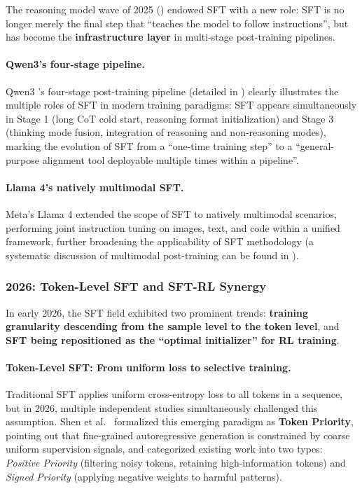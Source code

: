 The reasoning model wave of 2025 ()
endowed SFT with a new role:
SFT is no longer merely the final step that ``teaches the model to follow instructions'',
but has become the \textbf{infrastructure layer} in multi-stage post-training pipelines.

\paragraph{Qwen3's four-stage pipeline.}
Qwen3 \cite{yang2025qwen3}'s four-stage post-training pipeline (detailed in )
clearly illustrates the multiple roles of SFT in modern training paradigms:
SFT appears simultaneously in Stage 1 (long CoT cold start, reasoning format initialization)
and Stage 3 (thinking mode fusion, integration of reasoning and non-reasoning modes),
marking the evolution of SFT from a ``one-time training step'' to a ``general-purpose alignment tool deployable multiple times within a pipeline''.

\paragraph{Llama 4's natively multimodal SFT.}
Meta's Llama 4 \cite{meta2025llama4} extended the scope of SFT to natively multimodal scenarios,
performing joint instruction tuning on images, text, and code within a unified framework,
further broadening the applicability of SFT methodology
(a systematic discussion of multimodal post-training can be found in ).

\subsubsection{2026: Token-Level SFT and SFT-RL Synergy}
\label{sec:t1-2026}

In early 2026, the SFT field exhibited two prominent trends:
\textbf{training granularity descending from the sample level to the token level},
and \textbf{SFT being repositioned as the ``optimal initializer'' for RL training}.

\paragraph{Token-Level SFT: From uniform loss to selective training.}
Traditional SFT applies uniform cross-entropy loss to all tokens in a sequence,
but in 2026, multiple independent studies simultaneously challenged this assumption.
Shen et al.\ \cite{shen2026tokenpriority} formalized this emerging paradigm as
\textbf{Token Priority},
pointing out that fine-grained autoregressive generation is constrained by coarse uniform supervision signals,
and categorized existing work into two types:
\emph{Positive Priority} (filtering noisy tokens, retaining high-information tokens)
and \emph{Signed Priority} (applying negative weights to harmful patterns).


